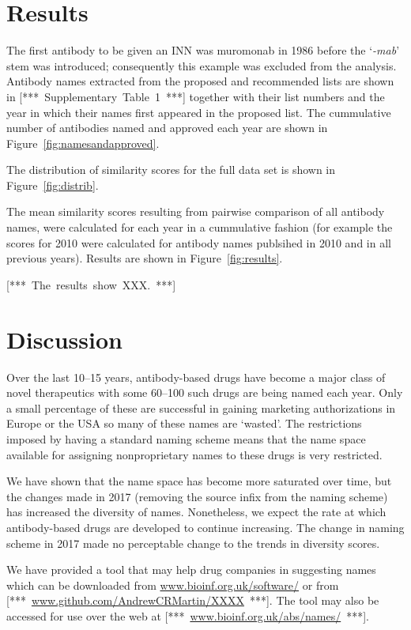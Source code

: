 \documentclass{article}
\newcommand{\eg}[1]{\mbox{`\emph{#1}'}}
\newcommand{\note}[1]{\mbox{\color{red}[*** #1 ***]}}
\begin{document}
\section{Results}
The first antibody to be given an INN was muromonab in 1986 before the
\eg{-mab} stem was introduced; consequently this example was excluded
from the analysis. Antibody names extracted from the proposed and
recommended lists are shown in \note{Supplementary Table~1} together
with their list numbers and the year in which their names first
appeared in the proposed list. The cummulative number of antibodies
named and approved each year are shown in
Figure~\ref{fig:namesandapproved}.

The distribution of similarity scores for the full data set is shown in
Figure~\ref{fig:distrib}. 

The mean similarity scores resulting from pairwise comparison of all
antibody names, were calculated for each year in a cummulative fashion
(for example the scores for 2010 were calculated for antibody names
publsihed in 2010 and in all previous years). Results are shown in
Figure~\ref{fig:results}. 

\note{The results show XXX.}

\section{Discussion}
Over the last 10--15 years, antibody-based drugs have become a major
class of novel therapeutics with some 60--100 such drugs are being
named each year. Only a small percentage of these are successful in
gaining marketing authorizations in Europe or the USA so many of these
names are `wasted'. The restrictions imposed by having a standard
naming scheme means that the name space available for assigning
nonproprietary names to these drugs is very restricted.

We have shown that the name space has become more saturated over time,
but the changes made in 2017 (removing the source infix from the
naming scheme) has increased the diversity of names. Nonetheless, we
expect the rate at which antibody-based drugs are developed to
continue increasing. The change in naming scheme in 2017 made no
perceptable change to the trends in diversity scores.

We have provided a tool that may help drug companies in suggesting
names which can be downloaded from \url{www.bioinf.org.uk/software/}
or from \note{\url{www.github.com/AndrewCRMartin/XXXX}}. The tool may also be
accessed for use over the web at \note{\url{www.bioinf.org.uk/abs/names/}}.



\end{document}
